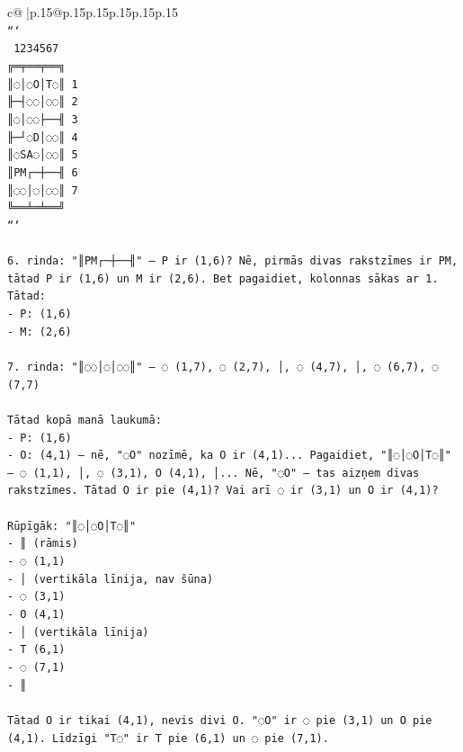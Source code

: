 \documentclass{article}
\begin{document}
{\begin{supertabular}{c@{$\;$}|p{.15\linewidth}@{}p{.15\linewidth}p{.15\linewidth}p{.15\linewidth}p{.15\linewidth}p{.15\linewidth}}
{{{\\ 
\texttt{```} \\
\texttt{ 1234567} \\
\texttt{╔═╤══╤══╗} \\
\texttt{║◌│◌O│T◌║ 1} \\
\texttt{╟─┤◌◌│◌◌║ 2} \\
\texttt{║◌│◌◌├──╢ 3} \\
\texttt{╟─┘◌D│◌◌║ 4} \\
\texttt{║◌SA◌│◌◌║ 5} \\
\texttt{║PM┌─┼──╢ 6} \\
\texttt{║◌◌│◌│◌◌║ 7} \\
\texttt{╚══╧═╧══╝} \\
\texttt{```} \\
\\ 
\texttt{6. rinda: "║PM┌─┼──╢" — P ir (1,6)? Nē, pirmās divas rakstzīmes ir PM, tātad P ir (1,6) un M ir (2,6). Bet pagaidiet, kolonnas sākas ar 1. Tātad:} \\
\texttt{{-} P: (1,6)} \\
\texttt{{-} M: (2,6)} \\
\\ 
\texttt{7. rinda: "║◌◌│◌│◌◌║" — ◌ (1,7), ◌ (2,7), │, ◌ (4,7), │, ◌ (6,7), ◌ (7,7)} \\
\\ 
\texttt{Tātad kopā manā laukumā:} \\
\texttt{{-} P: (1,6)} \\
\texttt{{-} O: (4,1) — nē, "◌O" nozīmē, ka O ir (4,1)... Pagaidiet, "║◌│◌O│T◌║" — ◌ (1,1), │, ◌ (3,1), O (4,1), │... Nē, "◌O" — tas aizņem divas rakstzīmes. Tātad O ir pie (4,1)? Vai arī ◌ ir (3,1) un O ir (4,1)?} \\
\\ 
\texttt{Rūpīgāk: "║◌│◌O│T◌║"} \\
\texttt{{-} ║ (rāmis)} \\
\texttt{{-} ◌ (1,1)} \\
\texttt{{-} │ (vertikāla līnija, nav šūna)} \\
\texttt{{-} ◌ (3,1)} \\
\texttt{{-} O (4,1)} \\
\texttt{{-} │ (vertikāla līnija)} \\
\texttt{{-} T (6,1)} \\
\texttt{{-} ◌ (7,1)} \\
\texttt{{-} ║} \\
\\ 
\texttt{Tātad O ir tikai (4,1), nevis divi O. "◌O" ir ◌ pie (3,1) un O pie (4,1). Līdzīgi "T◌" ir T pie (6,1) un ◌ pie (7,1).} \\
}}}
\end{supertabular}}
\end{document}
